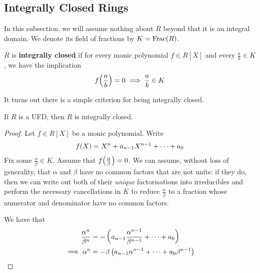 \subsection{Integrally Closed Rings}

In this subsection, we will assume nothing about $R$ beyond that it is an integral domain. We denote its field of fractions by $K = \operatorname{Frac}\!\left( R \right)$.

\begin{boxdefinition}
    $R$ is \textbf{integrally closed} if for every monic polynomial $f \in R[X]$ and every $\frac{a}{b} \in K$, we have the implication
    \begin{align*}
        f\!\left( \frac{a}{b} \right) = 0 \implies \frac{a}{b} \in K
    \end{align*}
\end{boxdefinition}

It turns out there is a simple criterion for being integrally closed.

\begin{boxproposition}\label{Ch1:Prop:UFDIntCl}
    If $R$ is a UFD, then $R$ is integrally closed.
\end{boxproposition}
\begin{proof}
    Let $f \in R[X]$ be a monic polynomial. Write
    \begin{align*}
        f\!\left( X \right) = X^n + a_{n-1} X^{n-1} + \cdots + a_0
    \end{align*}
    Fix some $\frac{\alpha}{\beta} \in K$. Assume that $f\!\left( \frac{\alpha}{\beta} \right) = 0$. We can assume, without loss of generality, that $\alpha$ and $\beta$ have no common factors that are not units: if they do, then we can write out both of their \textit{unique} factorisations into irreducibles and perform the necessary cancellations in $K$ to reduce $\frac{\alpha}{\beta}$ to a fraction whose numerator and denominator have no common factors.

    We have that
    \begin{align*}
        \frac{\alpha^n}{\beta^n} &= -\left( a_{n-1}\frac{\alpha^{n-1}}{\beta^{n-1}} + \cdots + a_0 \right) \\
        \implies \alpha^n &= -\beta\left( a_{n-1}\alpha^{n-1} + \cdots + a_0 \beta^{n-1} \right)
    \end{align*}
    \sorry
\end{proof}